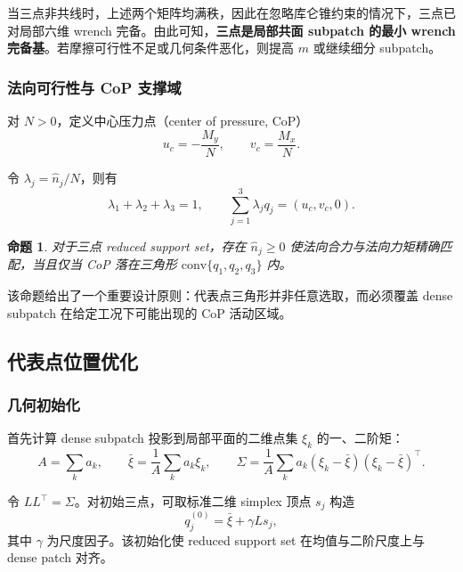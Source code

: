 \documentclass[UTF8,a4paper,11pt]{ctexart}
\newtheorem{proposition}{命题}[section]
\begin{document}
当三点非共线时，上述两个矩阵均满秩，因此在忽略库仑锥约束的情况下，三点已对局部六维 wrench 完备。由此可知，\textbf{三点是局部共面 subpatch 的最小 wrench 完备基}。若摩擦可行性不足或几何条件恶化，则提高 $m$ 或继续细分 subpatch。

\subsubsection{法向可行性与 CoP 支撑域}

对 $N>0$，定义中心压力点（center of pressure, CoP）
\begin{equation}
 u_c = -\frac{M_y}{N},
 \qquad
 v_c = \frac{M_x}{N}.
\end{equation}

令 $\lambda_j = \hat{n}_j/N$，则有
\begin{equation}
\lambda_1+\lambda_2+\lambda_3=1,
\qquad
\sum_{j=1}^{3}\lambda_j q_j = (u_c,v_c,0).
\end{equation}

\begin{proposition}
对于三点 reduced support set，存在 $\hat{n}_j\ge 0$ 使法向合力与法向力矩精确匹配，当且仅当 CoP 落在三角形 $\mathrm{conv}\{q_1,q_2,q_3\}$ 内。
\end{proposition}

该命题给出了一个重要设计原则：代表点三角形并非任意选取，而必须覆盖 dense subpatch 在给定工况下可能出现的 CoP 活动区域。

\subsection{代表点位置优化}

\subsubsection{几何初始化}

首先计算 dense subpatch 投影到局部平面的二维点集 $\xi_k$ 的一、二阶矩：
\begin{equation}
A = \sum_k a_k,
\qquad
\bar{\xi} = \frac{1}{A}\sum_k a_k \xi_k,
\qquad
\Sigma = \frac{1}{A}\sum_k a_k(\xi_k-\bar{\xi})(\xi_k-\bar{\xi})^\top.
\end{equation}

令 $LL^\top=\Sigma$。对初始三点，可取标准二维 simplex 顶点 $s_j$ 构造
\begin{equation}
 q_j^{(0)} = \bar{\xi} + \gamma L s_j,
\end{equation}
其中 $\gamma$ 为尺度因子。该初始化使 reduced support set 在均值与二阶尺度上与 dense patch 对齐。
\end{document}
